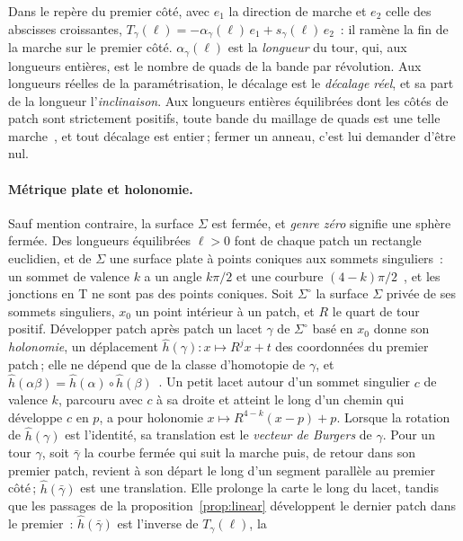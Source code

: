 \documentclass[11pt,a4paper]{article}
\newcommand{\shift}{s}
\begin{document}
Dans le repère du premier côté, avec $e_1$ la direction de marche et $e_2$
celle des abscisses croissantes, $T_\gamma(\ell) = -\alpha_\gamma(\ell)\, e_1 +
\shift_\gamma(\ell)\, e_2$~: il ramène la fin de la marche sur le premier
côté. $\alpha_\gamma(\ell)$ est la \emph{longueur} du tour, qui, aux longueurs entières, est le nombre de
quads de la bande par révolution. Aux longueurs réelles de la paramétrisation,
le décalage est le \emph{décalage réel}, et sa part de la longueur
l'\emph{inclinaison}. Aux longueurs entières équilibrées dont les côtés de
patch sont strictement positifs, toute bande du maillage de quads est une
telle marche~\cite[prop.~2]{gardent2026loops}, et tout décalage est
entier\,; fermer un anneau, c'est lui demander d'être nul.

\paragraph{Métrique plate et holonomie.}
Sauf mention contraire, la surface $\Sigma$ est fermée, et \emph{genre zéro}
signifie une sphère fermée. Des longueurs équilibrées $\ell > 0$ font de
chaque patch un rectangle euclidien, et de $\Sigma$ une surface plate à points
coniques aux sommets singuliers~: un sommet de valence $k$ a un angle
$k\pi/2$ et une courbure $(4-k)\pi/2$~\cite{troyanov1986surfaces}, et les jonctions en T ne sont pas des
points coniques. Soit $\Sigma^\circ$ la surface $\Sigma$ privée de ses
sommets singuliers, $x_0$ un point intérieur à un patch, et $R$ le quart de
tour positif. Développer patch après patch un lacet $\gamma$ de $\Sigma^\circ$
basé en $x_0$ donne son \emph{holonomie}, un déplacement $\hat
h(\gamma)\colon x \mapsto R^j x + t$ des coordonnées du premier patch\,; elle
ne dépend que de la classe d'homotopie de $\gamma$, et $\hat h(\alpha\beta) =
\hat h(\alpha) \circ \hat h(\beta)$~\cite{izmestiev2013torus}. Un petit lacet
autour d'un sommet singulier $c$ de valence $k$, parcouru avec $c$ à sa
droite et atteint le long d'un chemin qui développe $c$ en $p$, a pour
holonomie $x \mapsto R^{4-k}(x - p) + p$. Lorsque la rotation de $\hat
h(\gamma)$ est l'identité, sa translation est le \emph{vecteur de Burgers} de
$\gamma$. Pour un tour $\gamma$, soit $\bar\gamma$ la courbe fermée qui suit
la marche puis, de retour dans son premier patch, revient à son départ le long
d'un segment parallèle au premier côté\,; $\hat h(\bar\gamma)$ est une
translation. Elle prolonge la carte le long du lacet, tandis que les passages
de la proposition~\ref{prop:linear} développent le dernier patch dans le
premier~: $\hat h(\bar\gamma)$ est l'inverse de $T_\gamma(\ell)$, la
\end{document}
